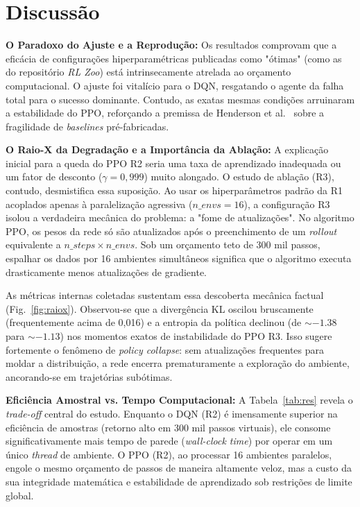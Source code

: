 \documentclass[conference]{IEEEtran}
\begin{document}
\section{Discussão}

\textbf{O Paradoxo do Ajuste e a Reprodução:} Os resultados comprovam que a eficácia de configurações hiperparamétricas publicadas como "ótimas" (como as do repositório \textit{RL Zoo}) está intrinsecamente atrelada ao orçamento computacional. O ajuste foi vitalício para o DQN, resgatando o agente da falha total para o sucesso dominante. Contudo, as exatas mesmas condições arruinaram a estabilidade do PPO, reforçando a premissa de Henderson et al.~\cite{henderson2018} sobre a fragilidade de \textit{baselines} pré-fabricadas.

\textbf{O Raio-X da Degradação e a Importância da Ablação:} A explicação inicial para a queda do PPO R2 seria uma taxa de aprendizado inadequada ou um fator de desconto ($\gamma=0{,}999$) muito alongado. O estudo de ablação (R3), contudo, desmistifica essa suposição. Ao usar os hiperparâmetros padrão da R1 acoplados apenas à paralelização agressiva ($n\_envs=16$), a configuração R3 isolou a verdadeira mecânica do problema: a "fome de atualizações". No algoritmo PPO, os pesos da rede só são atualizados após o preenchimento de um \textit{rollout} equivalente a $n\_steps \times n\_envs$. Sob um orçamento teto de 300 mil passos, espalhar os dados por 16 ambientes simultâneos significa que o algoritmo executa drasticamente menos atualizações de gradiente.

As métricas internas coletadas sustentam essa descoberta mecânica factual (Fig.~\ref{fig:raiox}). Observou-se que a divergência KL oscilou bruscamente (frequentemente acima de 0,016) e a entropia da política declinou (de $\sim -1.38$ para $\sim -1.13$) nos momentos exatos de instabilidade do PPO R3. Isso sugere fortemente o fenômeno de \textit{policy collapse}: sem atualizações frequentes para moldar a distribuição, a rede encerra prematuramente a exploração do ambiente, ancorando-se em trajetórias subótimas.

\textbf{Eficiência Amostral vs. Tempo Computacional:} A Tabela~\ref{tab:res} revela o \textit{trade-off} central do estudo. Enquanto o DQN (R2) é imensamente superior na eficiência de amostras (retorno alto em 300 mil passos virtuais), ele consome significativamente mais tempo de parede (\textit{wall-clock time}) por operar em um único \textit{thread} de ambiente. O PPO (R2), ao processar 16 ambientes paralelos, engole o mesmo orçamento de passos de maneira altamente veloz, mas a custo da sua integridade matemática e estabilidade de aprendizado sob restrições de limite global.
\end{document}
